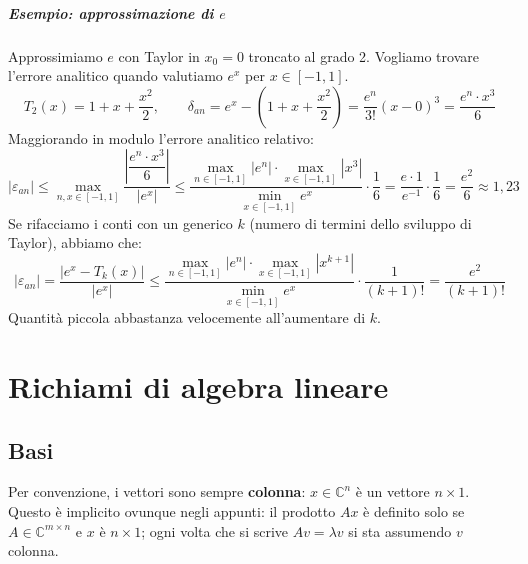 \documentclass[12pt,a4paper,]{report}
\begin{document}
\paragraph{Esempio: approssimazione di $e$}
Approssimiamo $e$ con Taylor in $x_0 = 0$ troncato al grado 2. Vogliamo trovare l'errore analitico quando valutiamo $e^x$ per $x \in [-1,1]$.
\[
T_2(x) = 1 + x + \frac{x^2}{2}, \qquad
\delta_{an} = e^x - \left(1 + x + \frac{x^2}{2}\right) = \frac{e^n}{3!}(x-0)^3 = \frac{e^n \cdot x^3}{6}
\]
Maggiorando in modulo l'errore analitico relativo:
\[
|\varepsilon_{an}| \le \max_{n,x\in[-1,1]} \frac{\left|\dfrac{e^n \cdot x^3}{6}\right|}{|e^x|}
\le \frac{\max_{n\in[-1,1]}|e^n| \cdot \max_{x\in[-1,1]}|x^3|}{\min_{x\in[-1,1]} e^x} \cdot \frac{1}{6}
= \frac{e \cdot 1}{e^{-1}} \cdot \frac{1}{6} = \frac{e^2}{6} \approx 1{,}23
\]
Se rifacciamo i conti con un generico $k$ (numero di termini dello sviluppo di Taylor), abbiamo che:
\[
|\varepsilon_{an}| = \frac{|e^x - T_k(x)|}{|e^x|}
\le \frac{\max_{n\in[-1,1]}|e^n| \cdot \max_{x\in[-1,1]}|x^{k+1}|}{\min_{x\in[-1,1]} e^x} \cdot \frac{1}{(k+1)!}
= \frac{e^2}{(k+1)!}
\]
Quantità piccola abbastanza velocemente all'aumentare di $k$.


\chapter{Richiami di algebra lineare}

\section{Basi}

\begin{nota}
    Per convenzione, i vettori sono sempre \textbf{colonna}: $x \in \mathbb{C}^n$ è un vettore $n \times 1$. Questo è implicito ovunque negli appunti: il prodotto $Ax$ è definito solo se $A \in \mathbb{C}^{m \times n}$ e $x$ è $n \times 1$; ogni volta che si scrive $Av = \lambda v$ si sta assumendo $v$ colonna.
\end{nota}
\end{document}
